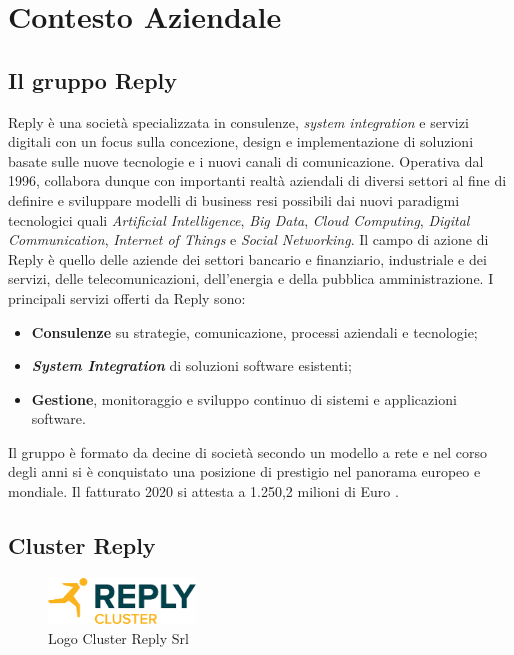 \graphicspath{{./chapters/01/assets/}}
\chapter{Contesto Aziendale}
\label{cha:intro}

\section{Il gruppo Reply}
Reply è una società specializzata in consulenze, \textit{system integration} e servizi digitali con un focus sulla concezione, design e implementazione di soluzioni basate sulle nuove tecnologie e i nuovi canali di comunicazione. Operativa dal 1996, collabora dunque con importanti realtà aziendali di diversi settori al fine di definire e sviluppare modelli di business resi possibili dai nuovi paradigmi tecnologici quali \textit{Artificial Intelligence}, \textit{Big Data}, \textit{Cloud Computing}, \textit{Digital Communication}, \textit{Internet of Things} e \textit{Social Networking}.
Il campo di azione di Reply è quello delle aziende dei settori bancario e finanziario, industriale e dei servizi, delle telecomunicazioni, dell'energia e della pubblica amministrazione.
I principali servizi offerti da Reply sono:
\begin{itemize}
  \item \textbf{Consulenze} su strategie, comunicazione, processi aziendali e tecnologie;
  \item \textbf{\textit{System Integration}} di soluzioni software esistenti;
  \item \textbf{Gestione}, monitoraggio e sviluppo continuo di sistemi e applicazioni software.
\end{itemize}

Il gruppo è formato da decine di società secondo un modello a rete e nel corso degli anni si è conquistato una posizione di prestigio nel panorama europeo e mondiale. Il fatturato 2020 si attesta a 1.250,2 milioni di Euro \cite{fatturato}.

\section{Cluster Reply}

\begin{figure}[ht]
  \centering
  \includegraphics[width=0.35\textwidth]{logo-cluster-reply.png}
  \caption{Logo Cluster Reply Srl}
  \label{fig:replyClusterLogo}
\end{figure}

